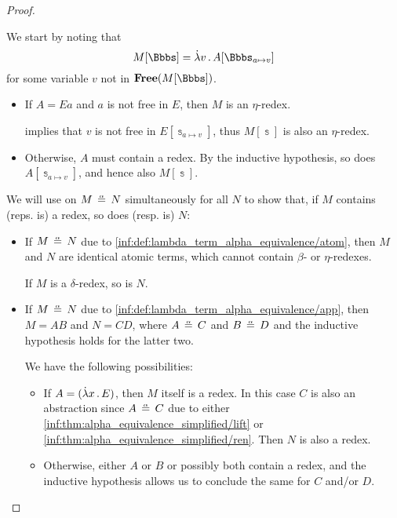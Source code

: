 \begin{proof}
\begin{itemize}
    We start by noting that
    \begin{equation*}
      M[\Bbbs] = \qabs v A[\Bbbs_{a \mapsto v}]
    \end{equation*}
    for some variable \( v \) not in \( \op*{Free}(M[\Bbbs]) \).

    \begin{itemize}
      \item If \( A = Ea \) and \( a \) is not free in \( E \), then \( M \) is an \( \eta \)-redex.

       implies that \( v \) is not free in \( E[\Bbbs_{a \mapsto v}] \), thus \( M[\Bbbs] \) is also an \( \eta \)-redex.

      \item Otherwise, \( A \) must contain a redex. By the inductive hypothesis, so does \( A[\Bbbs_{a \mapsto v}] \), and hence also \( M[\Bbbs] \).
    \end{itemize}
  \end{itemize}

   We will use  on \( M \aequiv N \) simultaneously for all \( N \) to show that, if \( M \) contains (reps. is) a redex, so does (resp. is) \( N \):
  \begin{itemize}
    \item If \( M \aequiv N \) due to \ref{inf:def:lambda_term_alpha_equivalence/atom}, then \( M \) and \( N \) are identical atomic terms, which cannot contain \( \beta \)- or \( \eta \)-redexes.

    If \( M \) is a \( \delta \)-redex, so is \( N \).

    \item If \( M \aequiv N \) due to \ref{inf:def:lambda_term_alpha_equivalence/app}, then \( M = AB \) and \( N = CD \), where \( A \aequiv C \) and \( B \aequiv D \) and the inductive hypothesis holds for the latter two.

    We have the following possibilities:
    \begin{itemize}
      \item If \( A = (\qabs x E) \), then \( M \) itself is a redex. In this case \( C \) is also an abstraction since \( A \aequiv C \) due to either \ref{inf:thm:alpha_equivalence_simplified/lift} or \ref{inf:thm:alpha_equivalence_simplified/ren}. Then \( N \) is also a redex.

      \item Otherwise, either \( A \) or \( B \) or possibly both contain a redex, and the inductive hypothesis allows us to conclude the same for \( C \) and/or \( D \).
    \end{itemize}


\end{itemize}
\end{proof}

